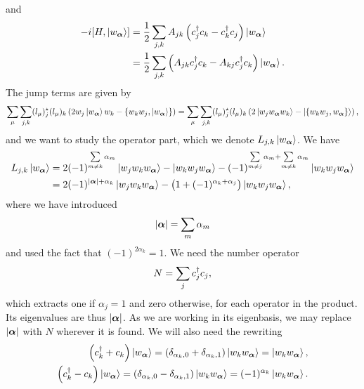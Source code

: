 and
\begin{align*}
	-i\comm{H}{\ket{w_{\vb*{\alpha}}}} &= \frac{1}{2}\sum\limits_{j, k}A_{jk}\left(c_{j}\adj c_{k} - c_{k}\adj c_{j}\right)\ket{w_{\vb*{\alpha}}} \\
	                                   &= \frac{1}{2}\sum\limits_{j, k}\left(A_{jk}c_{j}\adj c_{k} - A_{kj}c_{j}\adj c_{k}\right)\ket{w_{\vb*{\alpha}}}.
\end{align*}
The jump terms are given by
\begin{align*}
	\sum\limits_{\mu}\sum\limits_{j, k}(l_{\mu})_{j}\cc(l_{\mu})_{k}\left(2w_{j}\ket{w_{\vb*{\alpha}}}w_{k} - \acomm{w_{k}w_{j}}{\ket{w_{\vb*{\alpha}}}}\right) = \sum\limits_{\mu}\sum\limits_{j, k}(l_{\mu})_{j}\cc(l_{\mu})_{k}\left(2\ket{w_{j}w_{\vb*{\alpha}}w_{k}} - \ket{\acomm{w_{k}w_{j}}{w_{\vb*{\alpha}}}}\right),
\end{align*}
and we want to study the operator part, which we denote $L_{j, k}\ket{w_{\vb*{\alpha}}}$. We have
\begin{align*}
	L_{j, k}\ket{w_{\vb*{\alpha}}} &= 2(-1)^{\sum\limits_{m \neq k}\alpha_{m}}\ket{w_{j}w_{k}w_{\vb*{\alpha}}} - \ket{w_{k}w_{j}w_{\vb*{\alpha}}} - (-1)^{\sum\limits_{m \neq j}\alpha_{m} + \sum\limits_{m \neq k}\alpha_{m}}\ket{w_{k}w_{j}w_{\vb*{\alpha}}} \\
	                               &= 2(-1)^{\abs{\vb*{\alpha}} + \alpha_{k}}\ket{w_{j}w_{k}w_{\vb*{\alpha}}} - \left(1 + (-1)^{\alpha_{k} + \alpha_{j}}\right)\ket{w_{k}w_{j}w_{\vb*{\alpha}}},
\end{align*}
where we have introduced
\begin{align*}
	\abs{\vb*{\alpha}} = \sum\limits_{m}\alpha_{m}
\end{align*}
and used the fact that $(-1)^{2\alpha_{k}} = 1$. We need the number operator
\begin{align*}
	N = \sum\limits_{j}c_{j}^{\dagger} c_{j},
\end{align*}
which extracts one if $\alpha_{j} = 1$ and zero otherwise, for each operator in the product. Its eigenvalues are thus $\abs{\vb*{\alpha}}$. As we are working in its eigenbasis, we may replace $\abs{\vb*{\alpha}}$ with $N$ wherever it is found. We will also need the rewriting
\begin{align*}
	\left(c_{k}^{\dagger} + c_{k}\right)\ket{w_{\vb*{\alpha}}} = (\delta_{\alpha_{k}, 0} + \delta_{\alpha_{k}, 1})\ket{w_{k}w_{\vb*{\alpha}}} = \ket{w_{k}w_{\vb*{\alpha}}}, \\ 
	\left(c_{k}^{\dagger} - c_{k}\right)\ket{w_{\vb*{\alpha}}} = (\delta_{\alpha_{k}, 0} - \delta_{\alpha_{k}, 1})\ket{w_{k}w_{\vb*{\alpha}}} = (-1)^{\alpha_{k}}\ket{w_{k}w_{\vb*{\alpha}}}.
\end{align*}

